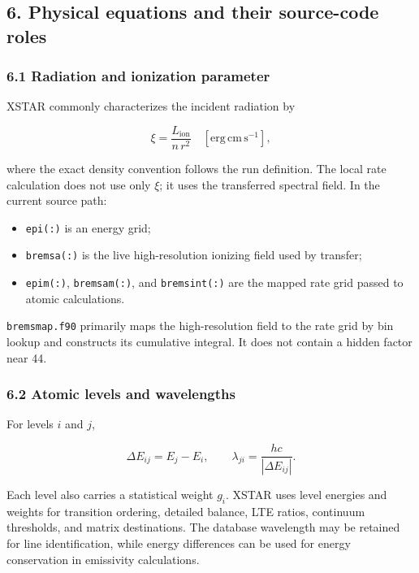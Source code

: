 \documentclass[
  10pt,
]{article}
\newcommand{\passthrough}[1]{#1}
\providecommand{\tightlist}{%
  \setlength{\itemsep}{0pt}\setlength{\parskip}{0pt}}
\begin{document}
\subsection{6. Physical equations and their source-code
roles}\label{physical-equations-and-their-source-code-roles}

\subsubsection{6.1 Radiation and ionization
parameter}\label{radiation-and-ionization-parameter}

XSTAR commonly characterizes the incident radiation by

\[
\xi = \frac{L_{\mathrm{ion}}}{n\,r^2}
\quad [\mathrm{erg\,cm\,s^{-1}}],
\]

where the exact density convention follows the run definition. The local
rate calculation does not use only \(\xi\); it uses the transferred
spectral field. In the current source path:

\begin{itemize}
\tightlist
\item
  \passthrough{\lstinline!epi(:)!} is an energy grid;
\item
  \passthrough{\lstinline!bremsa(:)!} is the live high-resolution
  ionizing field used by transfer;
\item
  \passthrough{\lstinline!epim(:)!},
  \passthrough{\lstinline!bremsam(:)!}, and
  \passthrough{\lstinline!bremsint(:)!} are the mapped rate grid passed
  to atomic calculations.
\end{itemize}

\passthrough{\lstinline!bremsmap.f90!} primarily maps the
high-resolution field to the rate grid by bin lookup and constructs its
cumulative integral. It does not contain a hidden factor near 44.

\subsubsection{6.2 Atomic levels and
wavelengths}\label{atomic-levels-and-wavelengths}

For levels \(i\) and \(j\),

\[
\Delta E_{ij} = E_j-E_i, \qquad
\lambda_{ji} = \frac{hc}{|\Delta E_{ij}|}.
\]

Each level also carries a statistical weight \(g_i\). XSTAR uses level
energies and weights for transition ordering, detailed balance, LTE
ratios, continuum thresholds, and matrix destinations. The database
wavelength may be retained for line identification, while energy
differences can be used for energy conservation in emissivity
calculations.
\end{document}

